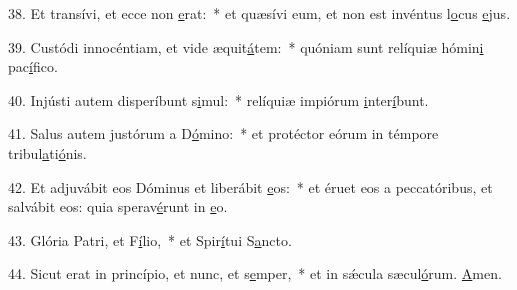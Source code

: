 38. Et transívi, et ecce non \uline{e}rat:~* et quæsívi eum, et non est invéntus l\uline{o}cus \uline{e}jus.\par 
39. Custódi innocéntiam, et vide æquit\uline{á}tem:~* quóniam sunt relíquiæ hómin\uline{i} pac\uline{í}fico.\par 
40. Injústi autem disperíbunt s\uline{i}mul:~* relíquiæ impiórum \uline{i}nter\uline{í}bunt.\par 
41. Salus autem justórum a D\uline{ó}mino:~* et protéctor eórum in témpore tribul\uline{a}ti\uline{ó}nis.\par 
42. Et adjuvábit eos Dóminus et liberábit \uline{e}os:~* et éruet eos a peccatóribus, et salvábit eos: quia sperav\uline{é}runt in \uline{e}o.\par 
43. Glória Patri, et F\uline{í}lio,~* et Spir\uline{í}tui S\uline{a}ncto.\par 
44. Sicut erat in princípio, et nunc, et s\uline{e}mper,~* et in sǽcula sæcul\uline{ó}rum. \uline{A}men.\par 

